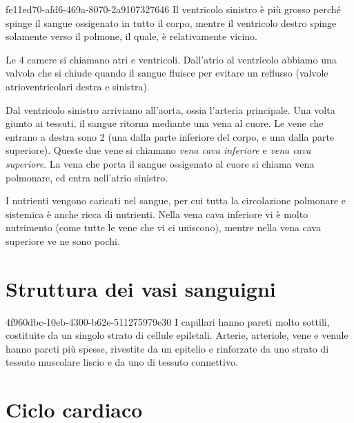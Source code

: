 \documentclass[preview]{standalone}
\begin{document}
\begin{snippet}{fe11ed70-afd6-469a-8070-2a9107327646}
    Il ventricolo sinistro è più grosso perché spinge il sangue ossigenato in tutto il corpo,
    mentre il ventricolo destro spinge solamente verso il polmone, il quale, è relativamente vicino.
    
    Le 4 camere si chiamano atri e ventricoli.
    Dall'atrio al ventricolo abbiamo una valvola che si chiude quando il sangue fluisce
    per evitare un reflusso (valvole atrioventricolari destra e sinistra).
    
    Dal ventricolo sinistro arriviamo all'aorta, ossia l'arteria principale.
    Una volta giunto ai tessuti, il sangue ritorna mediante una vena al cuore.
    Le vene che entrano a destra sono 2 (una dalla parte inferiore del corpo, e una dalla parte superiore).
    Queste due vene si chiamano \textit{vena cava inferiore} e \textit{vena cava superiore}.
    La vena che porta il sangue ossigenato al cuore si chiama vena polmonare, ed entra nell'atrio sinistro.
    
    
    I nutrienti vengono caricati nel sangue, per cui tutta la circolazione polmonare e sistemica
    è anche ricca di nutrienti. Nella vena cava inferiore vi è molto nutrimento
    (come tutte le vene che vi ci uniscono), mentre nella vena cava superiore ve ne sono pochi.

\end{snippet}

\section{Struttura dei vasi sanguigni}

\begin{snippet}{4f960dbc-10eb-4300-b62e-511275979e30}
    I capillari hanno pareti molto sottili, costituite da un singolo strato di cellule epiletali.
    Arterie, arteriole, vene e venule hanno pareti più spesse, rivestite da un epitelio e rinforzate da uno strato di tessuto muscolare liscio e da uno di tessuto connettivo.
\end{snippet}


\section{Ciclo cardiaco}
\end{document}
